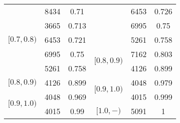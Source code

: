 \begin{table}[h]
\begin{center}
\begin{threeparttable}
\begin{tabular}{c c c | c c c}
  \multirow{5}{*}{$[0.7, 0.8)$} & 8434 & 0.71  & & 6453 & 0.726 \\
  & 3665 & 0.713  & & 6995 & 0.75 \\
  & 6453 & 0.721  & & 5261 & 0.758 \\
  \cline{4-6}
  & 6995 & 0.75  & \multirow{2}{*}{$[0.8, 0.9)$} & 7162 & 0.803 \\
  & 5261 & 0.758  & & 4126 & 0.899 \\
  \cline{1-3}
  \cline{4-6}
  $[0.8, 0.9)$ & 4126 & 0.899 & \multirow{2}{*}{$[0.9, 1.0)$} & 4048 & 0.979 \\
  \cline{1-3}
  \multirow{2}{*}{$[0.9, 1.0)$} & 4048 & 0.969  & & 4015 & 0.999 \\
  \cline{4-6}
  & 4015 & 0.99  & $[1.0, -)$ & 5091 & 1 \\
  \bottomrule
\end{tabular}
\end{threeparttable}
\end{center}
\end{table}

